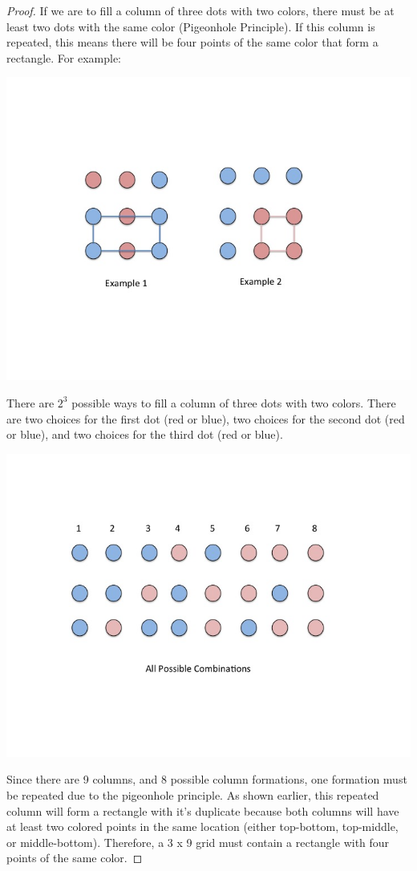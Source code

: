 \documentclass[10pt,letter]{article}
\begin{document}
\begin{proof}
If we are to fill a column of three dots with two colors, there must be at least two dots with the same color (Pigeonhole Principle). If this column is repeated, this means there will be four points of the same color that form a rectangle.
For example: \\
\begin{minipage}{.8\textwidth}
\includegraphics[width=.8\linewidth]{Slide1.jpg}
\end{minipage}

There are $2^3$ possible ways to fill a column of three dots with two colors. There are two choices for the first dot (red or blue), two choices for the second dot (red or blue), and two choices for the third dot (red or blue). 

\begin{minipage}{.8\textwidth}
\includegraphics[width=.8\linewidth]{Slide2.jpg}
\end{minipage}

Since there are 9 columns, and 8 possible column formations, one formation must be repeated due to the pigeonhole principle. As shown earlier, this repeated column will form a rectangle with it's duplicate because both columns will have at least two colored points in the same location (either top-bottom, top-middle, or middle-bottom). Therefore, a 3 x 9 grid must contain a rectangle with four points of the same color. 
\end{proof}
\end{document}
